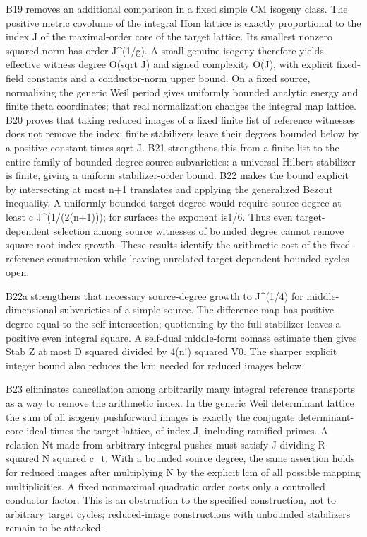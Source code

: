 \documentclass[11pt,a4paper]{article}
\theoremstyle{definition}
\begin{document}
B19 removes an additional comparison in a fixed simple CM isogeny class.
The positive metric covolume of the integral Hom lattice is exactly
proportional to the index J of the maximal-order core of the target
lattice. Its smallest nonzero squared norm has order J\^{}(1/g). A small
genuine isogeny therefore yields effective witness degree O(sqrt J) and
signed complexity O(J), with explicit fixed-field constants and a
conductor-norm upper bound. On a fixed source, normalizing the generic
Weil period gives uniformly bounded analytic energy and finite theta
coordinates; that real normalization changes the integral map lattice.
B20 proves that taking reduced images of a fixed finite list of
reference witnesses does not remove the index: finite stabilizers leave
their degrees bounded below by a positive constant times sqrt J. B21
strengthens this from a finite list to the entire family of
bounded-degree source subvarieties: a universal Hilbert stabilizer is
finite, giving a uniform stabilizer-order bound. B22 makes the bound
explicit by intersecting at most n+1 translates and applying the
generalized Bezout inequality. A uniformly bounded target degree would
require source degree at least c J\^{}(1/(2(n+1))); for surfaces the
exponent is1/6. Thus even target-dependent selection among source
witnesses of bounded degree cannot remove square-root index growth.
These results identify the arithmetic cost of the fixed-reference
construction while leaving unrelated target-dependent bounded cycles
open.

B22a strengthens that necessary source-degree growth to J\^{}(1/4) for
middle-dimensional subvarieties of a simple source. The difference map
has positive degree equal to the self-intersection; quotienting by the
full stabilizer leaves a positive even integral square. A self-dual
middle-form comass estimate then gives \textbar Stab Z\textbar{} at most
D squared divided by 4(n!) squared V0. The sharper explicit integer
bound also reduces the lcm needed for reduced images below.

B23 eliminates cancellation among arbitrarily many integral reference
transports as a way to remove the arithmetic index. In the generic Weil
determinant lattice the sum of all isogeny pushforward images is exactly
the conjugate determinant-core ideal times the target lattice, of index
J, including ramified primes. A relation Nt made from arbitrary integral
pushes must satisfy J dividing R squared N squared c\_t. With a bounded
source degree, the same assertion holds for reduced images after
multiplying N by the explicit lcm of all possible mapping
multiplicities. A fixed nonmaximal quadratic order costs only a
controlled conductor factor. This is an obstruction to the specified
construction, not to arbitrary target cycles; reduced-image
constructions with unbounded stabilizers remain to be attacked.
\end{document}
